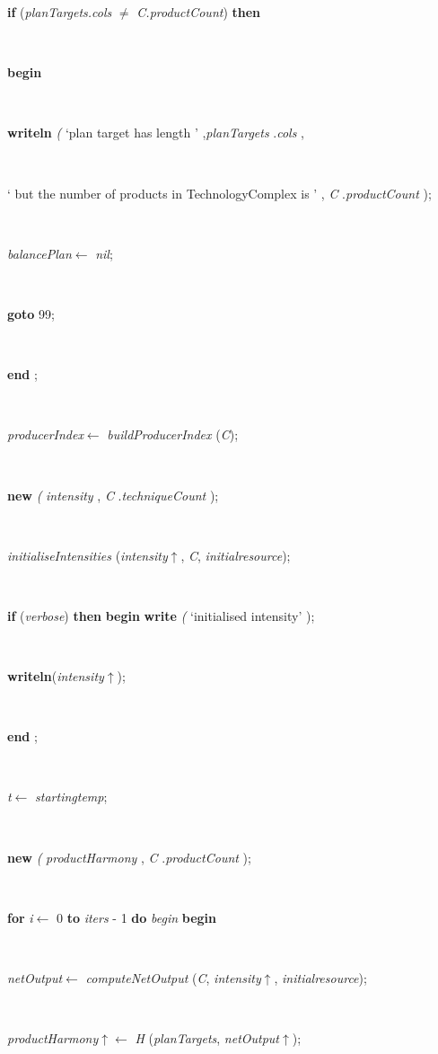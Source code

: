 \begin{tabbing}
\+\parbox{14cm}{\textsf {\textbf {if } \textsf{(\textit{planTargets.cols} $\neq$ \textit{C.productCount})} \textbf{ then } }}\\
\<\parbox{14cm}{\textsf{\textbf{begin} }}\\
\parbox{14cm}{\textsf{\textbf{writeln} \textit{(} \textrm{\textup { `plan target has length ' } },\textit{planTargets} .\textit{cols} ,}}\\
\parbox{14cm}{\textsf{\textrm{\textup { ` but the number of products in TechnologyComplex is ' } }, \textit{C} .\textit{productCount}      );}}\\
\parbox{14cm}{\textsf{\textit{balancePlan}$\leftarrow$ \textit{nil}}; }\\
\parbox{14cm}{\textsf {\textbf {goto } \textsf{99}; }}\\
\<\-\parbox{14cm}{\textsf{\textbf{end} ;}}\\
\parbox{14cm}{\textsf{\textit{producerIndex}$\leftarrow$ \textit{buildProducerIndex} (\textit{C})}; }\\
\parbox{14cm}{\textsf{\textbf{new} \textit{(} \textit{intensity} , \textit{C} .\textit{techniqueCount} );}}\\
\parbox{14cm}{\textsf{\textit{initialiseIntensities} (\textit{intensity}$\uparrow$\textit{}, \textit{C}, \textit{initialresource})}; }\\
\+\parbox{14cm}{\textsf {\textbf {if } \textsf{(\textit{verbose})} \textbf{ then } \textsf{ \textbf{begin}  \textbf{write} \textit{(} \textrm{\textup { `initialised intensity' } });}}}\\
\parbox{14cm}{\textsf{\textbf{writeln}(\textit{intensity}$\uparrow$\textit{})}; }\\
\<\-\parbox{14cm}{\textsf{\textbf{end} ;}}\\
\parbox{14cm}{\textsf{\textit{t}$\leftarrow$ \textit{startingtemp}}; }\\
\parbox{14cm}{\textsf{\textbf{new}  \textit{(}  \textit{productHarmony} , \textit{C} .\textit{productCount} );}}\\
\+\<\parbox{14cm}{\textsf {\textbf {for } \textsf{\textit{i}$\leftarrow$ 0} \textbf{ to } \textsf{\textit{iters} - 1} \textbf{ do } \textsf{\textit{begin}} \textbf{ begin } }}\\
\parbox{14cm}{\textsf{\textit{netOutput}$\leftarrow$ \textit{computeNetOutput} (\textit{C}, \textit{intensity}$\uparrow$\textit{}, \textit{initialresource})}; }\\
\parbox{14cm}{\textsf{\textit{productHarmony}$\uparrow$\textit{}$\leftarrow$ \textit{H} (\textit{planTargets}, \textit{netOutput}$\uparrow$\textit{})}; }\\

\end{tabbing}

